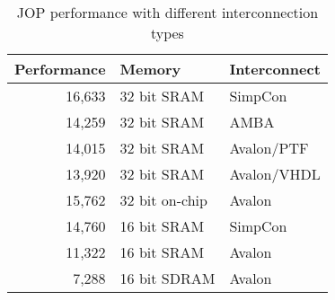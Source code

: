 \begin{table}
    \centering

    \begin{tabular}{rll}
        \toprule
        Performance &      Memory     & Interconnect \\
        \midrule
        16,633 &  32 bit SRAM & SimpCon \\

        14,259 &  32 bit SRAM & AMBA \\

        14,015 &  32 bit SRAM & Avalon/PTF \\
        13,920 &  32 bit SRAM & Avalon/VHDL \\
        15,762 & 32 bit on-chip & Avalon\\

        14,760 &  16 bit SRAM & SimpCon \\

        11,322 &  16 bit SRAM & Avalon \\


         7,288  & 16 bit SDRAM & Avalon \\


%
%
%
%
%


        \bottomrule

    \end{tabular}
    \caption{JOP performance with different interconnection types}
    \label{tab:perf:diff}


\end{table}

